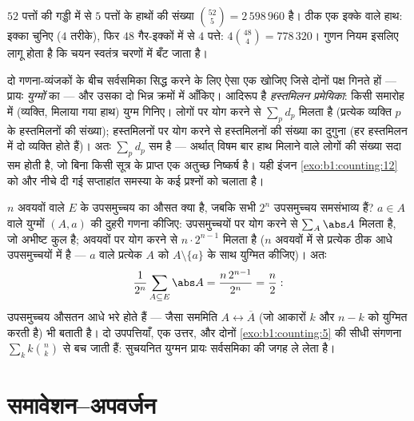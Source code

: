 \begin{example}[ताश जैसी गणना]\label{ex:b1:counting:poker}
$52$ पत्तों की गड्डी में से $5$ पत्तों के हाथों की संख्या $\binom{52}{5} =
2\,598\,960$ है। ठीक एक इक्के वाले हाथ: इक्का चुनिए ($4$ तरीके), फिर $48$
गैर-इक्कों में से $4$ पत्ते: $4 \binom{48}{4} = 778\,320$। गुणन नियम इसलिए
लागू होता है कि चयन स्वतंत्र चरणों में बँट जाता है।
\end{example}

\begin{method}[दुहरी गणना]\label{met:b1:counting:doublecount}
दो गणना-व्यंजकों के बीच सर्वसमिका सिद्ध करने के लिए ऐसा एक 
खोजिए जिसे दोनों पक्ष गिनते हों --- प्रायः \emph{युग्मों} का  --- और
उसका  दो भिन्न क्रमों में आँकिए। आदिरूप है \emph{हस्तमिलन प्रमेयिका}:
किसी समारोह में (व्यक्ति, मिलाया गया हाथ) युग्म गिनिए। लोगों पर योग करने से
$\sum_p d_p$ मिलता है (प्रत्येक व्यक्ति $p$ के हस्तमिलनों की संख्या);
हस्तमिलनों पर योग करने से हस्तमिलनों की संख्या का दुगुना (हर हस्तमिलन में दो
व्यक्ति होते हैं)। अतः $\sum_p d_p$ सम है --- अर्थात् विषम बार हाथ मिलाने
वाले लोगों की संख्या सदा सम होती है, जो बिना किसी सूत्र के प्राप्त एक अतुच्छ
निष्कर्ष है। यही इंजन \cref{exo:b1:counting:12} को और नीचे दी गई सप्ताहांत
समस्या के कई प्रश्नों को चलाता है।
\end{method}

\begin{example}\label{ex:b1:counting:averagesubset}
$n$ अवयवों वाले  $E$ के उपसमुच्चय का औसत  क्या है, जबकि सभी
$2^n$ उपसमुच्चय समसंभाव्य हैं? $a \in A$ वाले युग्मों $(A, a)$ की दुहरी गणना
कीजिए: उपसमुच्चयों पर योग करने से $\sum_A \abs A$ मिलता है, जो अभीष्ट कुल
है; अवयवों पर योग करने से $n \cdot 2^{n-1}$ मिलता है ($n$ अवयवों में से
प्रत्येक ठीक आधे उपसमुच्चयों में है --- $a$ वाले प्रत्येक $A$ को $A
\setminus \{a\}$ के साथ युग्मित कीजिए)। अतः
\[
\frac{1}{2^n}\sum_{A \subseteq E} \abs A
= \frac{n\,2^{n-1}}{2^n} = \frac n2 :
\]
उपसमुच्चय औसतन आधे भरे होते हैं --- जैसा सममिति $A \leftrightarrow \overline
A$ (जो आकारों $k$ और $n - k$ को युग्मित करती है) भी बताती है। दो उपपत्तियाँ,
एक उत्तर, और दोनों \cref{exo:b1:counting:5} की सीधी संगणना $\sum_k k\binom
nk$ से बच जाती हैं: सुचयनित युग्मन प्रायः सर्वसमिका की जगह ले लेता है।
\end{example}

\section{समावेशन--अपवर्जन}

